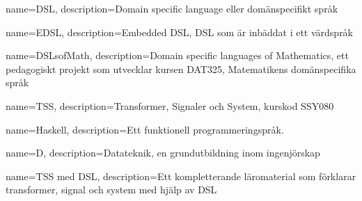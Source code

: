 {
    name=DSL,
    description={Domain specific language eller domänspecifikt språk}
}

{
    name=EDSL,
    description={Embedded DSL, DSL som är inbäddat i ett värdspråk}
}

{
    name=DSLsofMath,
    description={Domain specific languages of Mathematics, ett pedagogiskt projekt som utvecklar kursen DAT325, Matematikens domänspecifika språk}
}


{
    name=TSS,
    description={Transformer, Signaler och System, kurskod SSY080}
}

{
	name=Haskell,
	description={Ett funktionell programmeringspråk.}
}

{
    name=D,
    description={Datateknik, en grundutbildning inom ingenjörskap}
}

{
    name={TSS med DSL},
    description={Ett kompletterande läromaterial som förklarar transformer, signal och system med hjälp av DSL}
}